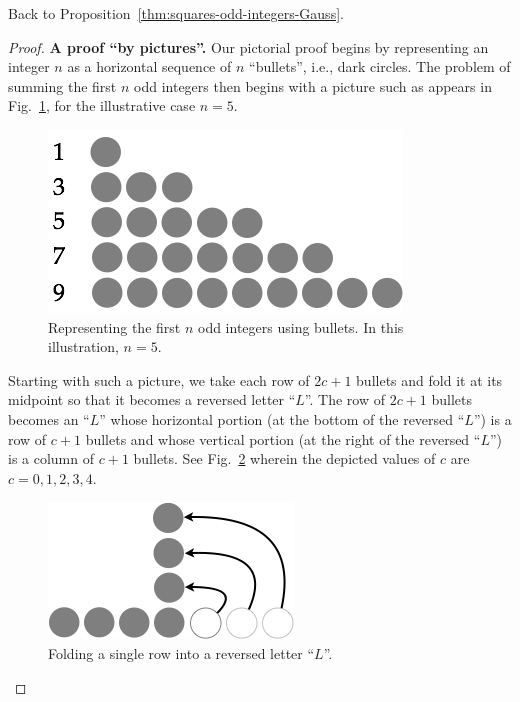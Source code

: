 \medskip

\noindent
Back to Proposition~\ref{thm:squares-odd-integers-Gauss}.

\begin{proof}
{\bf A proof ``by pictures''.}
%
Our pictorial proof begins by representing an integer $n$ as a
horizontal sequence of $n$ ``bullets'', i.e., dark circles.  The
problem of summing the first $n$ odd integers then begins with a
picture such as appears in Fig.~\ref{fig:sumOdds1}, for the
illustrative case $n=5$.
\begin{figure}[h]
\begin{center}
       \includegraphics[scale=0.4]{FiguresMaths/SumOddsBasis}
\caption{Representing the first $n$ odd integers using bullets.  In
  this illustration, $n=5$.}
       \label{fig:sumOdds1}
\end{center}
\end{figure}

Starting with such a picture, we take each row of $2c+1$ bullets and
fold it at its midpoint so that it becomes a reversed letter ``$L$''.  The
row of $2c+1$ bullets becomes an ``$L$'' whose horizontal portion (at the
bottom of the reversed ``$L$'') is a row of $c+1$ bullets and whose
vertical portion (at the right of the reversed ``$L$'') is a column of
$c+1$ bullets.  See Fig.~\ref{fig:sumOdds2} wherein the depicted
values of $c$ are $c = 0, 1, 2, 3, 4$.
\begin{figure}[h]
\begin{center}
       \includegraphics[scale=0.4]{FiguresMaths/SumOddsIntermediate}
              \caption{Folding a single row into a reversed letter ``$L$''.}
       \label{fig:sumOdds2}
\end{center}
\end{figure}


\end{proof}
